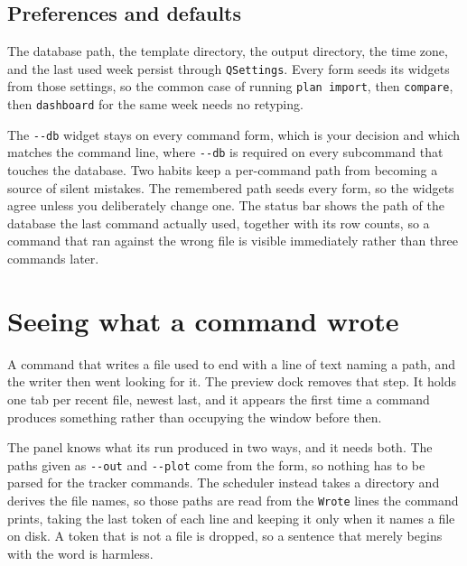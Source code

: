 \documentclass[11pt]{article}
\begin{document}
\subsection{Preferences and defaults}
\label{sec:org048b0fd}

The database path, the template directory, the output directory, the time zone,
and the last used week persist through \texttt{QSettings}. Every form seeds its widgets
from those settings, so the common case of running \texttt{plan import}, then
\texttt{compare}, then \texttt{dashboard} for the same week needs no retyping.

The \texttt{-{}-{}db} widget stays on every command form, which is your decision and which
matches the command line, where \texttt{-{}-{}db} is required on every subcommand that
touches the database. Two habits keep a per-command path from becoming a source
of silent mistakes. The remembered path seeds every form, so the widgets agree
unless you deliberately change one. The status bar shows the path of the
database the last command actually used, together with its row counts, so a
command that ran against the wrong file is visible immediately rather than three
commands later.
\section{Seeing what a command wrote}
\label{sec:orgceefa4a}

A command that writes a file used to end with a line of text naming a path, and
the writer then went looking for it. The preview dock removes that step. It
holds one tab per recent file, newest last, and it appears the first time a
command produces something rather than occupying the window before then.

The panel knows what its run produced in two ways, and it needs both. The paths
given as \texttt{-{}-{}out} and \texttt{-{}-{}plot} come from the form, so nothing has to be parsed
for the tracker commands. The scheduler instead takes a directory and derives
the file names, so those paths are read from the \texttt{Wrote} lines the command
prints, taking the last token of each line and keeping it only when it names a
file on disk. A token that is not a file is dropped, so a sentence that merely
begins with the word is harmless.
\end{document}
